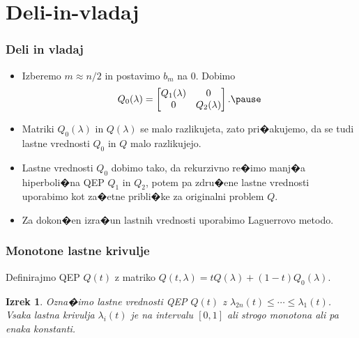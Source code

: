 \documentclass[9pt]{beamer}
\newtheorem{izrek}{Izrek}
\begin{document}
\section{Deli-in-vladaj}
\begin{frame}
\frametitle{Deli in vladaj}
\begin{itemize}

\item Izberemo $m\approx n/2$ in postavimo $b_m$ na $0$. Dobimo
$$Q_0(\lambda)
  =\left[\begin{matrix}Q_1(\lambda) & 0 \cr 0 & Q_2(\lambda)\end{matrix}\right].\pause$$
  
\item Matriki $Q_0(\lambda)$ in $Q(\lambda)$ se malo razlikujeta,  zato  pri�akujemo, da se tudi lastne
vrednosti $Q_0$ in $Q$ malo
razlikujejo.\vspace{1em}\pause

\item Lastne vrednosti $Q_0$ dobimo tako, da rekurzivno re�imo 
manj�a hiperboli�na QEP $Q_1$ in $Q_2$, potem pa 
zdru�ene lastne vrednosti uporabimo kot za�etne pribli�ke za
originalni problem $Q$.\vspace{1em}\pause

\item Za dokon�en izra�un lastnih vrednosti uporabimo Laguerrovo metodo.
\end{itemize}
 
\end{frame}
\begin{frame}
\frametitle{Monotone lastne krivulje}

Definirajmo QEP $Q(t)$ z matriko
$Q(t,\lambda)=tQ(\lambda)+(1-t)Q_0(\lambda)$.

\begin{izrek}
   Ozna�imo lastne vrednosti QEP
   $Q(t)$ z $\lambda_{2n}(t)\le \cdots \le \lambda_1(t)$.
   Vsaka lastna krivulja $\lambda_i(t)$ je na
   intervalu $[0,1]$ ali strogo monotona ali pa enaka konstanti.
   \label{monotono}
\end{izrek}



\end{frame}
\end{document}
